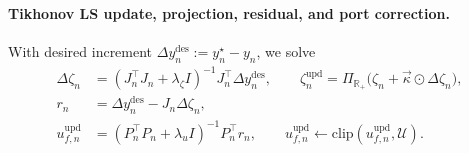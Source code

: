 \paragraph{Tikhonov LS update, projection, residual, and port correction.}
With desired increment $\Delta y_n^{\mathrm{des}}:=y_n^\star-y_n$, we solve
\begin{align}
\label{eq:impl:tikhonov_update}
\Delta\zeta_n&=(J_n^\top J_n+\lambda_\zeta I)^{-1}J_n^\top \Delta y_n^{\mathrm{des}},\qquad
\zeta_n^{\mathrm{upd}}=\Pi_{\mathbb{R}_+}\big(\zeta_n+\vec{\kappa}\odot\Delta\zeta_n\big),\\
\label{eq:impl:residual}
r_n&=\Delta y_n^{\mathrm{des}}-J_n\Delta\zeta_n,\\
\label{eq:impl:port_update}
u_{f,n}^{\mathrm{upd}}&=(P_n^\top P_n+\lambda_u I)^{-1}P_n^\top r_n,\qquad
u_{f,n}^{\mathrm{upd}}\leftarrow \mathrm{clip}(u_{f,n}^{\mathrm{upd}},\mathcal{U}).
\end{align}

